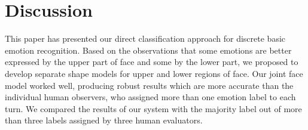 \documentclass[10pt,journal,cspaper,compsoc]{IEEEtran}
\begin{document}

\section{Discussion}
\label{sec_discussion}

This paper has presented our direct classification approach for discrete basic emotion recognition. Based on the observations that some emotions are better expressed by the upper part of face and some by the lower part, we proposed to develop separate shape models for upper and lower regions of face. Our joint face model worked well, producing robust results which are more accurate than the individual human observers, who assigned more than one emotion label to each turn. We compared the results of our system with the majority label out of more than three labels assigned by three human evaluators.
\end{document}

